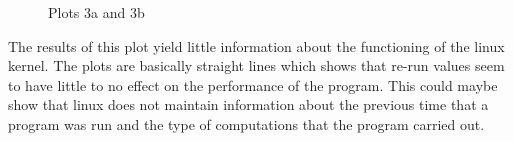 \documentclass[11pt] {article}
\begin{document}
\begin {figure} [ht]
\begin {center}
\end {center}
\caption {Plots 3a and 3b}
\end {figure}

The results of this plot yield little information about the functioning of the linux kernel.
The plots are basically straight lines which shows that re-run values seem to have little to
no effect on the performance of the program. This could maybe show that linux does not 
maintain information about the previous time that a program was run and the type of computations
that the program carried out.\cite{rube}
\end{document}

